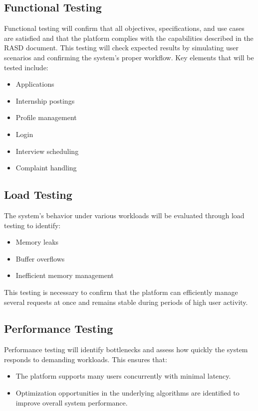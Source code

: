 \subsection{Functional Testing}
Functional testing will confirm that all objectives, specifications, and use cases are satisfied and that the platform complies with the capabilities described in the RASD document. This testing will check expected results by simulating user scenarios and confirming the system's proper workflow. Key elements that will be tested include:
\begin{itemize}
    \item Applications
    \item Internship postings
    \item Profile management
    \item Login
    \item Interview scheduling
    \item Complaint handling
\end{itemize}

\subsection{Load Testing}
The system's behavior under various workloads will be evaluated through load testing to identify:
\begin{itemize}
    \item Memory leaks
    \item Buffer overflows
    \item Inefficient memory management
\end{itemize}
This testing is necessary to confirm that the platform can efficiently manage several requests at once and remains stable during periods of high user activity.

\subsection{Performance Testing}
Performance testing will identify bottlenecks and assess how quickly the system responds to demanding workloads. This ensures that:
\begin{itemize}
    \item The platform supports many users concurrently with minimal latency.
    \item Optimization opportunities in the underlying algorithms are identified to improve overall system performance.
\end{itemize}

